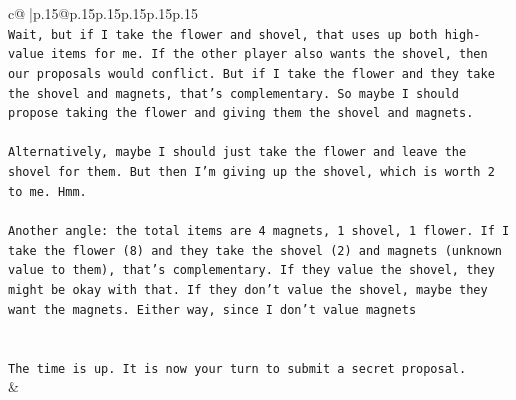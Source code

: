 \documentclass{article}
\begin{document}
{\begin{supertabular}{c@{$\;$}|p{.15\linewidth}@{}p{.15\linewidth}p{.15\linewidth}p{.15\linewidth}p{.15\linewidth}p{.15\linewidth}}
{{{\\ 
\texttt{Wait, but if I take the flower and shovel, that uses up both high{-}value items for me. If the other player also wants the shovel, then our proposals would conflict. But if I take the flower and they take the shovel and magnets, that's complementary. So maybe I should propose taking the flower and giving them the shovel and magnets. } \\
\\ 
\texttt{Alternatively, maybe I should just take the flower and leave the shovel for them. But then I'm giving up the shovel, which is worth 2 to me. Hmm. } \\
\\ 
\texttt{Another angle: the total items are 4 magnets, 1 shovel, 1 flower. If I take the flower (8) and they take the shovel (2) and magnets (unknown value to them), that's complementary. If they value the shovel, they might be okay with that. If they don't value the shovel, maybe they want the magnets. Either way, since I don't value magnets} \\
\\ 
\\ 
\texttt{The time is up. It is now your turn to submit a secret proposal.} \\
            }
        }
    }
    & \\ \\


\end{supertabular}}
\end{document}
